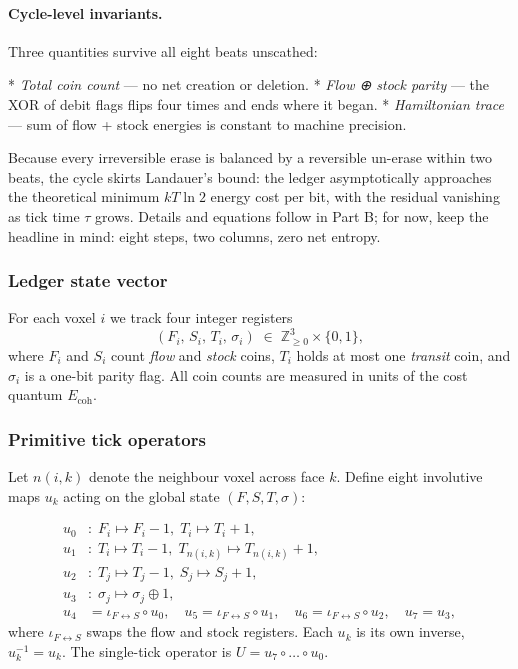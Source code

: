 \documentclass[11pt,oneside]{book}
\begin{document}
\paragraph{Cycle-level invariants.}
Three quantities survive all eight beats unscathed:

* \emph{Total coin count} — no net creation or deletion.
* \emph{Flow ⊕ stock parity} — the XOR of debit flags flips four times and ends
  where it began.
* \emph{Hamiltonian trace} — sum of flow + stock energies is constant to
  machine precision.

Because every irreversible erase is balanced by a reversible un-erase within
two beats, the cycle skirts Landauer’s bound: the ledger asymptotically
approaches the theoretical minimum \(kT\ln 2\) energy cost per bit, with the
residual vanishing as tick time \(\tau\) grows.  Details and equations follow
in Part B; for now, keep the headline in mind: eight steps, two columns,
zero net entropy.


\subsubsection{Ledger state vector}
\label{subsubsec:state-vector}
For each voxel \(i\) we track four integer registers
\[
  (F_{i},\,S_{i},\,T_{i},\,\sigma_{i})
  \;\in\;
  \mathbb{Z}_{\ge 0}^{3}\times\{0,1\},
\]
where  
\(F_{i}\) and \(S_{i}\) count \emph{flow} and \emph{stock} coins,  
\(T_{i}\) holds at most one \emph{transit} coin, and  
\(\sigma_{i}\) is a one-bit parity flag.  
All coin counts are measured in units of the cost quantum \(E_{\text{coh}}\).

\subsubsection{Primitive tick operators}
\label{subsubsec:primitive-ops}
Let \(n(i,k)\) denote the neighbour voxel across face \(k\).
Define eight involutive maps \(u_{k}\) acting on the global state
\((F,S,T,\sigma)\):

\[
\begin{aligned}
u_{0}&:\;
  F_{i}\!\mapsto\!F_{i}-1,\;
  T_{i}\!\mapsto\!T_{i}+1,
\\[2pt]
u_{1}&:\;
  T_{i}\!\mapsto\!T_{i}-1,\;
  T_{n(i,k)}\!\mapsto\!T_{n(i,k)}+1,
\\[2pt]
u_{2}&:\;
  T_{j}\!\mapsto\!T_{j}-1,\;
  S_{j}\!\mapsto\!S_{j}+1,
\\[2pt]
u_{3}&:\;
  \sigma_{j}\!\mapsto\!\sigma_{j}\oplus 1,
\\[4pt]
u_{4}&=\iota_{F\leftrightarrow S}\circ u_{0},\quad
u_{5}=\iota_{F\leftrightarrow S}\circ u_{1},\quad
u_{6}=\iota_{F\leftrightarrow S}\circ u_{2},\quad
u_{7}=u_{3},
\end{aligned}
\]
where \(\iota_{F\leftrightarrow S}\) swaps the flow and stock registers.
Each \(u_{k}\) is its own inverse, \(u_{k}^{-1}=u_{k}\).  
The single-tick operator is
\(
  U = u_{7}\!\circ\!\dots\!\circ u_{0}.
\)
\end{document}
